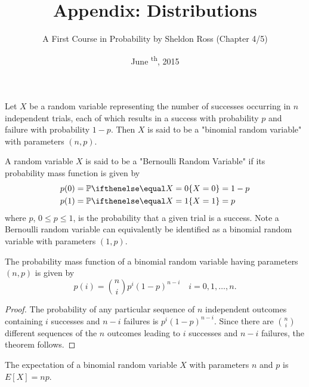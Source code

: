 \documentclass[a4paper,8pt]{article}
\title{Appendix: Distributions}
\author{A First Course in Probability by Sheldon Ross (Chapter 4/5)}
\date{June \textsuperscript{th}, 2015}
\begin{document}
\maketitle
{}

\begin{outline}

    Let \(X\) be a random variable representing the number of successes occurring in \(n\) independent trials,
    each of which results in a success with probability \(p\) and failure with probability \(1-p\). Then
    \(X\) is said to be a "binomial random variable" with parameters \((n, p)\).

    A random variable \(X\) is said to be a "Bernoulli Random Variable" if its probability mass function is given by
    \begin{align*}
      p(0) &= \bbp[X=0] = 1 - p \\
      p(1) &= \bbp[X=1] = p
    \end{align*}
    where \(p\), \(0 \leq p \leq 1\), is the probability that a given trial is a success. Note a Bernoulli random
    variable can equivalently be identified as a binomial random variable with parameters \((1, p)\).

    The probability mass function of a binomial random variable having parameters \((n, p)\) is given by
    \[ p(i) = \binom{n}{i}p^i(1-p)^{n-i}\quad i=0,1,\ldots,n\text{.} \]

    \begin{proof}
      The probability of any particular sequence of \(n\) independent outcomes containing \(i\) successes and
      \(n-i\) failures is \(p^i(1-p)^{n-i}\). Since there are \(\binom{n}{i}\) different sequences of the \(n\)
      outcomes leading to \(i\) successes and \(n-i\) failures, the theorem follows.
    \end{proof}

    The expectation of a binomial random variable \(X\) with parameters \(n\) and \(p\) is \(E[X] = np\).


\end{outline}
\end{document}
